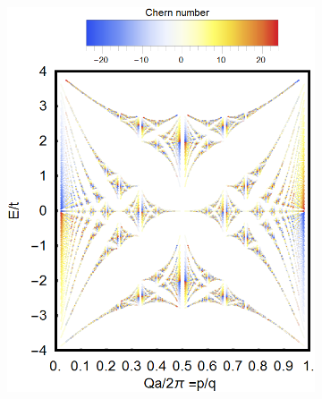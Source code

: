 \documentclass[letterpaper, 10 pt, conference]{ieeeconf}  %
\begin{document}
\begin{figure}[tbph]
\label{fig:bandstructure}
\begin{subfigure}{.5\linewidth}
\centering
\includegraphics{butterfly50ChernNormalTotal.png}
\label{fig:sub1}
\end{subfigure}
\begin{subfigure}{.1\linewidth}
\centering

\end{subfigure}
\end{figure}
\end{document}
